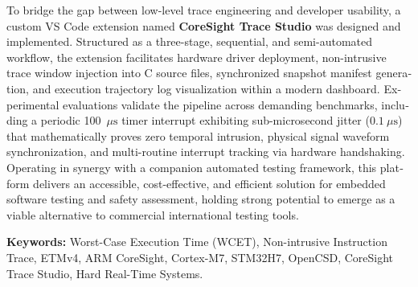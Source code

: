 \begin{latin}
\medskip\noindent
To bridge the gap between low-level trace engineering and developer usability, a custom VS Code extension named \textbf{CoreSight Trace Studio} was designed and implemented. Structured as a three-stage, sequential, and semi-automated workflow, the extension facilitates hardware driver deployment, non-intrusive trace window injection into C source files, synchronized snapshot manifest generation, and execution trajectory log visualization within a modern dashboard. Experimental evaluations validate the pipeline across demanding benchmarks, including a periodic 100~$\mu\text{s}$ timer interrupt exhibiting sub-microsecond jitter ($0.1~\mu\text{s}$) that mathematically proves zero temporal intrusion, physical signal waveform synchronization, and multi-routine interrupt tracking via hardware handshaking. Operating in synergy with a companion automated testing framework, this platform delivers an accessible, cost-effective, and efficient solution for embedded software testing and safety assessment, holding strong potential to emerge as a viable alternative to commercial international testing tools.

\vspace{0.4cm}
\noindent
\textbf{Keywords:} Worst-Case Execution Time (WCET), Non-intrusive Instruction Trace, ETMv4, ARM CoreSight, Cortex-M7, STM32H7, OpenCSD, CoreSight Trace Studio, Hard Real-Time Systems.
\end{latin}
